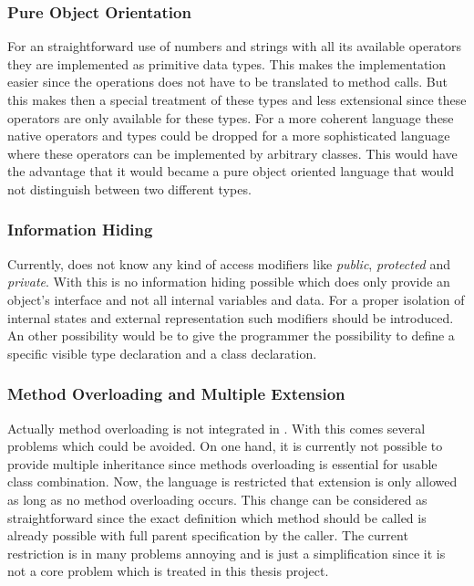 \subsubsection{Pure Object Orientation}
For an straightforward use of numbers and strings with all its available
operators they are implemented as primitive data types. This makes the
implementation easier since the operations does not have to be translated
to method calls. But this makes then a special treatment of these types
and less extensional since these operators are only available for these
types. For a more coherent language these native operators and types could
be dropped for a more sophisticated language where these operators can be
implemented by arbitrary classes. This would have the advantage that it
would became a pure object oriented language that would not distinguish
between two different types.

\subsubsection{Information Hiding}
Currently, \ooplss does not know any kind of access modifiers like
\emph{public}, \emph{protected} and \emph{private}. With this is no
information hiding possible which does only provide an object's interface
and not all internal variables and data. For a proper isolation of
internal states and external representation such modifiers should be
introduced. An other possibility would be to give the programmer the
possibility to define a specific visible type declaration and a class
declaration.

\subsubsection{Method Overloading and Multiple Extension}
Actually method overloading is not integrated in \ooplss. With this
comes several problems which could be avoided. On one hand, it is currently
not possible to provide multiple inheritance since methods overloading is
essential for usable class combination. Now, the language is restricted
that extension is only allowed as long as no method overloading occurs.
This change can be considered as straightforward since the exact definition
which method should be called is already possible with full parent
specification by the caller. The current restriction is in many problems
annoying and is just a simplification since it is not a core problem which
is treated in this thesis project.

